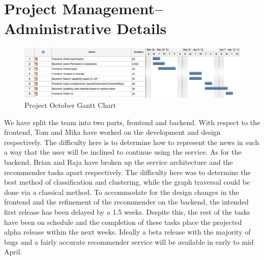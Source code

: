 \documentclass[11pt,letterpaper]{article}
\begin{document}
\section{Project Management--Administrative Details}

\begin{figure}
\centering
\includegraphics[scale=0.45]{img/octoborg-gantt.png}
\caption{Project October Gantt Chart}
\label{fig:gantt}
\end{figure}

We have split the team into two parts, frontend and backend. With respect to the frontend, Tom and Mika have worked on the development and design respectively.
The difficulty here is to determine how to represent the news in such a way that the user will be inclined to continue using the service.
As for the backend, Brian and Raja have broken up the service architecture and the recommender tasks apart respectively.
The difficulty here was to determine the best method of classification and clustering, while the graph traversal could be done via a classical method.
To accommodate for the design changes in the frontend and the refinement of the recommender on the backend, the intended first release has been delayed by a 1.5 weeks.
Despite this, the rest of the tasks have been on schedule and the completion of these tasks place the projected alpha release within the next weeks.
Ideally a beta release with the majority of bugs and a fairly accurate recommender service will be available in early to mid April.
\end{document}
